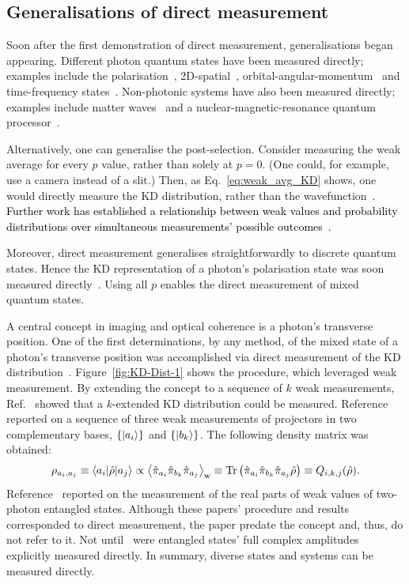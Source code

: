 \documentclass[%
 reprint,
superscriptaddress,
nofootinbib,
bibnotes,
 amsmath,amssymb,
 aps,
]{revtex4-1}
\theoremstyle{plain}
\newcommand{\Dave}[1]{\textcolor{black}{#1} }
\newcommand{\nicole}[1]{\textcolor{black}{#1} }
\begin{document}
\subsection{Generalisations of direct measurement }
\label{SubSec:general_direct}

Soon after the first demonstration of direct measurement, generalisations began appearing. 
Different photon quantum states have been measured directly; examples include the polarisation~\cite{Salvail2013,Thekkadath2016,Kim2018}, 2D-spatial~\cite{Zhang2020}, orbital-angular-momentum~\cite{Malik2014,Bolduc2016} and time-frequency states~\cite{Ogawa2021}. 
Non-photonic systems have also been measured directly; examples include matter waves~\cite{Denkmayr2017} and a nuclear-magnetic-resonance quantum processor~\cite{Lu2014}. 

Alternatively, one can generalise the post-selection. Consider measuring the weak average for every $p$ value, rather than solely at $p=0$. (One could, for example, use a camera instead of a slit.) Then, as Eq.~\eqref{eq:weak_avg_KD} shows, one would directly measure the KD distribution, 
rather than the wavefunction~\cite{Lundeen2012}.  \Dave{Further work has established a relationship between weak values and \nicole{probability distributions over simultaneous measurements' possible outcomes~\cite{ozawa2011universal}.  }  }


Moreover, direct measurement generalises straightforwardly to discrete quantum states. Hence the KD representation of a photon's polarisation state was soon measured directly~\cite{Salvail2013}. 
Using all $p$  enables the direct measurement of mixed quantum states.

A central concept in imaging and optical coherence is a photon's transverse position. One of the first determinations, by any method, of the mixed state of a photon's transverse position was accomplished via direct measurement of the KD distribution~\cite{Bamber2014}. Figure~\ref{fig:KD-Dist-1} shows the procedure, which leveraged weak measurement. By extending the concept to a sequence of $k$ weak measurements, Ref.~\cite{Lundeen2012} showed that a $k$-extended KD distribution could be measured. 
Reference~\cite{Lundeen2012} reported on a sequence of three weak measurements of projectors in two complementary bases, $\left\{ \ket{ a_{i}} \right\} $ and $\left\{ \ket{b_{k}} \right\} $.
The following density matrix was obtained:
\begin{equation}
\label{eq:direct_rho}
\rho_{a_{i},a_{j}}\equiv\braket{a_i | \hat{\rho}|a_j}\propto\left\langle\hat{\pi}_{a_{i}}\hat{\pi}_{b_{k}}\hat{\pi}_{a_{j}}\right\rangle _{\mathrm{w}}
\equiv \mathrm{Tr}\left(\hat{\pi}_{a_{i}}\hat{\pi}_{b_{k}}\hat{\pi}_{a_{j}}\hat{\rho}\right)
\equiv Q_{i,k,j}(\hat{\rho}). 
\end{equation}
Reference~\cite{Yokota2009,Lundeen2009} reported on the measurement of the real parts of weak values of two-photon entangled states.
Although these papers' procedure and results 
corresponded to direct measurement, the paper predate the concept and, thus, do not refer to it. Not until~\cite{Pan2019} were entangled states' full complex amplitudes explicitly measured directly. In summary, 
diverse states and systems can be measured directly.
\end{document}
